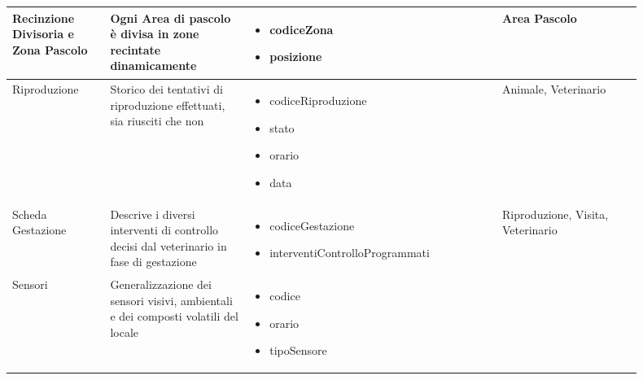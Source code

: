 \documentclass[12pt,a4paper]{article}
\begin{document}
\begin{center}
\begin{longtable}{|p{0.14\linewidth}|p{0.20\linewidth}|p{0.36\linewidth}|p{0.20\linewidth}|}
\hline
Recinzione Divisoria e Zona Pascolo &  Ogni Area di pascolo è divisa in zone recintate dinamicamente 
					& \begin{itemize}
						\setlength{\itemindent}{-1em}
						\vspace{-25pt}
						\setlength\itemsep{-0.25em}
						\item codiceZona
						\item posizione
						 
					\end{itemize}
					&  Area Pascolo \\

\hline
Riproduzio\-ne 		&  Storico dei tentativi di riproduzione effettuati, sia riusciti che non 
					& \begin{itemize}
						\setlength{\itemindent}{-1em}
						\vspace{-25pt}
						\setlength\itemsep{-0.25em}
						\item codiceRiproduzione
						\item stato
						\item orario
						\item data
					\end{itemize}
					&  Animale, Veterinario \\

\hline
Scheda Gestazio\-ne 	&  Descrive i diversi interventi di controllo decisi dal veterinario in fase di gestazione 
					& \begin{itemize}
						\setlength{\itemindent}{-1em}
						\vspace{-25pt}
						\setlength\itemsep{-0.25em}
						\item codiceGestazione
						\item interventi\-Controllo\-Programmati
						
						
					\end{itemize}
					&  Riproduzione, Visita, Veterinario \\

\hline
Sensori 				&  Ge\-ne\-ra\-liz\-za\-zio\-ne dei sensori visivi, ambientali e dei composti volatili del locale  
					& \begin{itemize}
						\setlength{\itemindent}{-1em}
						\vspace{-25pt}
						\setlength\itemsep{-0.25em}
						\item codice
						\item orario
						\item tipoSensore
						

\end{itemize}
\end{longtable}
\end{center}
\end{document}
